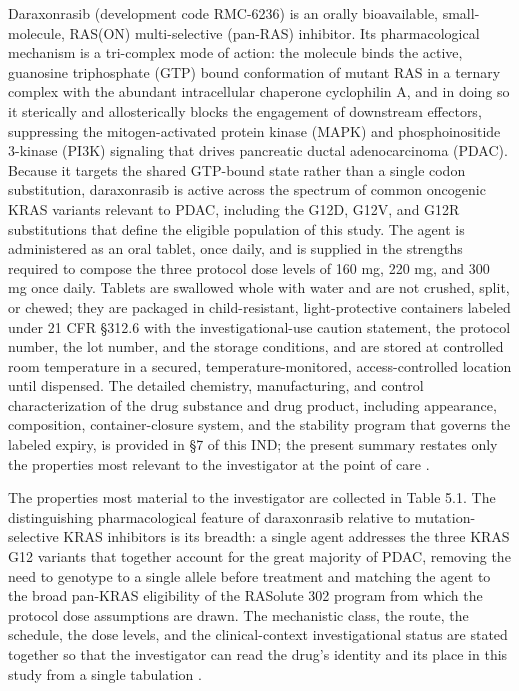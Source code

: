 Daraxonrasib (development code RMC-6236) is an orally bioavailable, small-molecule,
RAS(ON) multi-selective (pan-RAS) inhibitor. Its pharmacological mechanism is a
tri-complex mode of action: the molecule binds the active, guanosine triphosphate
(GTP) bound conformation of mutant RAS in a ternary complex with the abundant
intracellular chaperone cyclophilin A, and in doing so it sterically and
allosterically blocks the engagement of downstream effectors, suppressing the
mitogen-activated protein kinase (MAPK) and phosphoinositide 3-kinase (PI3K)
signaling that drives pancreatic ductal adenocarcinoma (PDAC). Because it targets
the shared GTP-bound state rather than a single codon substitution, daraxonrasib is
active across the spectrum of common oncogenic KRAS variants relevant to PDAC,
including the G12D, G12V, and G12R substitutions that define the eligible population
of this study. The agent is administered as an oral tablet, once daily, and is
supplied in the strengths required to compose the three protocol dose levels of
160 mg, 220 mg, and 300 mg once daily. Tablets are swallowed whole with water and
are not crushed, split, or chewed; they are packaged in child-resistant,
light-protective containers labeled under 21 CFR \S 312.6 with the
investigational-use caution statement, the protocol number, the lot number, and the
storage conditions, and are stored at controlled room temperature in a secured,
temperature-monitored, access-controlled location until dispensed. The detailed
chemistry, manufacturing, and control characterization of the drug substance and
drug product, including appearance, composition, container-closure system, and the
stability program that governs the labeled expiry, is provided in \S 7 of this IND;
the present summary restates only the properties most relevant to the investigator
at the point of care \cite{daraxwhipple,pdac060s2030}.

The properties most material to the investigator are collected in Table 5.1. The
distinguishing pharmacological feature of daraxonrasib relative to mutation-selective
KRAS inhibitors is its breadth: a single agent addresses the three KRAS G12 variants
that together account for the great majority of PDAC, removing the need to genotype
to a single allele before treatment and matching the agent to the broad pan-KRAS
eligibility of the RASolute 302 program from which the protocol dose assumptions are
drawn. The mechanistic class, the route, the schedule, the dose levels, and the
clinical-context investigational status are stated together so that the investigator
can read the drug's identity and its place in this study from a single tabulation
\cite{daraxwhipple,natlpaiplatf}.

